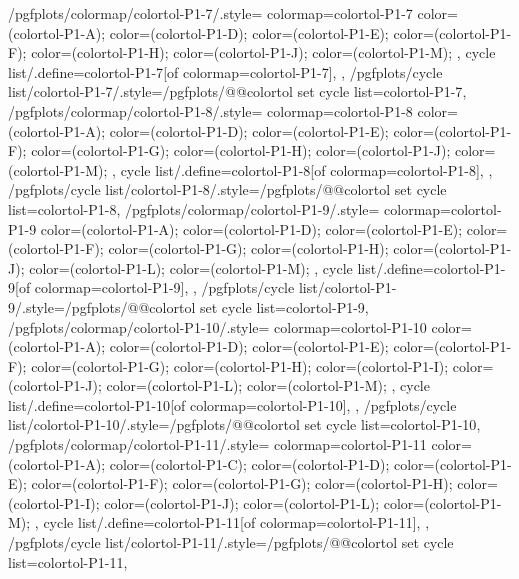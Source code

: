 {  %
  /pgfplots/colormap/colortol-P1-7/.style={
    colormap={colortol-P1-7}{
      color=(colortol-P1-A);
      color=(colortol-P1-D);
      color=(colortol-P1-E);
      color=(colortol-P1-F);
      color=(colortol-P1-H);
      color=(colortol-P1-J);
      color=(colortol-P1-M);
    },
    cycle list/.define={colortol-P1-7}{[of colormap=colortol-P1-7]},
  },
  /pgfplots/cycle list/colortol-P1-7/.style={/pgfplots/@@colortol set cycle list={colortol-P1-7}},
  /pgfplots/colormap/colortol-P1-8/.style={
    colormap={colortol-P1-8}{
      color=(colortol-P1-A);
      color=(colortol-P1-D);
      color=(colortol-P1-E);
      color=(colortol-P1-F);
      color=(colortol-P1-G);
      color=(colortol-P1-H);
      color=(colortol-P1-J);
      color=(colortol-P1-M);
    },
    cycle list/.define={colortol-P1-8}{[of colormap=colortol-P1-8]},
  },
  /pgfplots/cycle list/colortol-P1-8/.style={/pgfplots/@@colortol set cycle list={colortol-P1-8}},
  /pgfplots/colormap/colortol-P1-9/.style={
    colormap={colortol-P1-9}{
      color=(colortol-P1-A);
      color=(colortol-P1-D);
      color=(colortol-P1-E);
      color=(colortol-P1-F);
      color=(colortol-P1-G);
      color=(colortol-P1-H);
      color=(colortol-P1-J);
      color=(colortol-P1-L);
      color=(colortol-P1-M);
    },
    cycle list/.define={colortol-P1-9}{[of colormap=colortol-P1-9]},
  },
  /pgfplots/cycle list/colortol-P1-9/.style={/pgfplots/@@colortol set cycle list={colortol-P1-9}},
  /pgfplots/colormap/colortol-P1-10/.style={
    colormap={colortol-P1-10}{
      color=(colortol-P1-A);
      color=(colortol-P1-D);
      color=(colortol-P1-E);
      color=(colortol-P1-F);
      color=(colortol-P1-G);
      color=(colortol-P1-H);
      color=(colortol-P1-I);
      color=(colortol-P1-J);
      color=(colortol-P1-L);
      color=(colortol-P1-M);
    },
    cycle list/.define={colortol-P1-10}{[of colormap=colortol-P1-10]},
  },
  /pgfplots/cycle list/colortol-P1-10/.style={/pgfplots/@@colortol set cycle list={colortol-P1-10}},
  /pgfplots/colormap/colortol-P1-11/.style={
    colormap={colortol-P1-11}{
      color=(colortol-P1-A);
      color=(colortol-P1-C);
      color=(colortol-P1-D);
      color=(colortol-P1-E);
      color=(colortol-P1-F);
      color=(colortol-P1-G);
      color=(colortol-P1-H);
      color=(colortol-P1-I);
      color=(colortol-P1-J);
      color=(colortol-P1-L);
      color=(colortol-P1-M);
    },
    cycle list/.define={colortol-P1-11}{[of colormap=colortol-P1-11]},
  },
  /pgfplots/cycle list/colortol-P1-11/.style={/pgfplots/@@colortol set cycle list={colortol-P1-11}},
}
